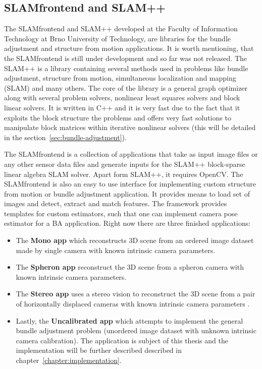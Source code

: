 \subsection*{SLAM\textunderscore frontend and SLAM++}
The SLAM\textunderscore frontend  and SLAM++ developed at the Faculty of Information Technology at Brno University of Technology, are libraries for the bundle adjustment and structure from motion applications. It is worth mentioning, that the SLAM\textunderscore frontend is still under development and so far was not released. The SLAM++ is a library containing several methods used in problems like bundle adjustment, structure from motion, simultaneous localization and mapping (SLAM) and many others. The core of the library is a general graph optimizer along with several problem solvers, nonlinear least squares solvers and block linear solvers. It is written in C++ and it is very fast due to the fact that it exploits the block structure the problems and offers very fast solutions to manipulate block matrices within iterative nonlinear solvers (this will be detailed in the section~\ref{sec:bundle-adjustment}).

The SLAM\textunderscore frontend is a collection of applications that take as input image files or any other sensor data files and generate inputs for the SLAM++ block-sparse linear algebra SLAM solver. Apart form SLAM++, it requires OpenCV. The SLAM\textunderscore frontend is also an easy to use interface for implementing custom structure from motion or bundle adjustment application. It provides means to load set of images and detect, extract and match features. The framework provides templates for custom estimators, such that one can implement camera pose estimator for a BA application. Right now there are three finished applications:

\begin{itemize}
	\item The \textbf{Mono app} which reconstructs 3D scene from an ordered image dataset made by single camera with known intrinsic camera parameters.
	
	\item The \textbf{Spheron app} reconstruct the 3D scene from a spheron camera with known intrinsic camera parameters.
	
	\item The \textbf{Stereo app} uses a stereo vision to reconstruct the 3D scene from a pair of horizontally displaced cameras with known intrinsic camera parameters .
	
	\item Lastly, the \textbf{Uncalibrated app} which attempts to implement the general bundle adjustment problem (unordered image dataset with unknown intrinsic camera calibration). The application is subject of this thesis and the implementation will be further described described in chapter~\ref{chapter:implementation}.
\end{itemize}

